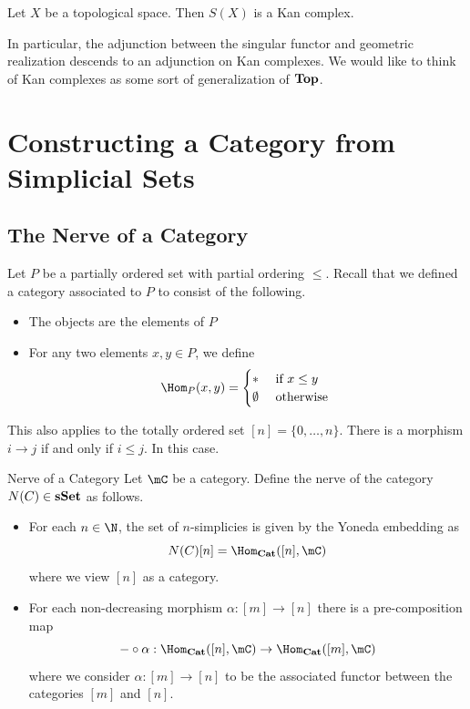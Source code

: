 \documentclass[a4paper]{article}
\begin{document}
\begin{lmm}{}{} Let $X$ be a topological space. Then $S(X)$ is a Kan complex. 
\end{lmm}

In particular, the adjunction between the singular functor and geometric realization descends to an adjunction on Kan complexes. We would like to think of Kan complexes as some sort of generalization of $\bold{Top}$. 

\pagebreak
\section{Constructing a Category from Simplicial Sets}
\subsection{The Nerve of a Category}
Let $P$ be a partially ordered set with partial ordering $\leq$. Recall that we defined a category associated to $P$ to consist of the following. 
\begin{itemize}
\item The objects are the elements of $P$
\item For any two elements $x,y\in P$, we define $$\Hom_P(x,y)=\begin{cases}
\ast & \text{ if }x\leq y\\
\emptyset & \text{ otherwise }
\end{cases}$$
\end{itemize}

This also applies to the totally ordered set $[n]=\{0,\dots,n\}$. There is a morphism $i\to j$ if and only if $i\leq j$. In this case. 

\begin{defn}{Nerve of a Category}{} Let $\mC$ be a category. Define the nerve of the category $N(C)\in\bold{sSet}$ as follows. 
\begin{itemize}
\item For each $n\in\N$, the set of $n$-simplicies is given by the Yoneda embedding as $$N(C)[n]=\Hom_\bold{Cat}([n],\mC)$$ where we view $[n]$ as a category. 
\item For each non-decreasing morphism $\alpha:[m]\to[n]$ there is a pre-composition map $$-\circ\alpha:\Hom_\bold{Cat}([n],\mC)\to\Hom_\bold{Cat}([m],\mC)$$ where we consider $\alpha:[m]\to[n]$ to be the associated functor between the categories $[m]$ and $[n]$. 
\end{itemize}
\end{defn}
\end{document}
